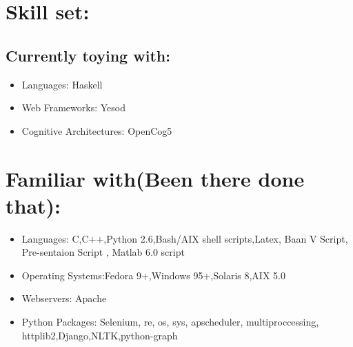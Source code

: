 \section {Skill set:}
	\subsection {Currently toying with:}
		\begin{itemize}
			\item Languages: Haskell

	 		\item Web Frameworks: Yesod

	 		\item Cognitive Architectures: OpenCog5
		\end{itemize}
		
\section {Familiar with(Been there done that):}
	\begin{itemize}
	
		\item Languages: C,C++,Python 2.6,Bash/AIX shell scripts,Latex, Baan V Script, Pre-sentaion Script , Matlab 6.0 script

		\item Operating Systems:Fedora 9+,Windows 95+,Solaris 8,AIX 5.0

		\item Webservers: Apache

		\item Python Packages: Selenium, re, os, sys, apscheduler, multiproccessing, httplib2,Django,NLTK,python-graph
	\end{itemize}
